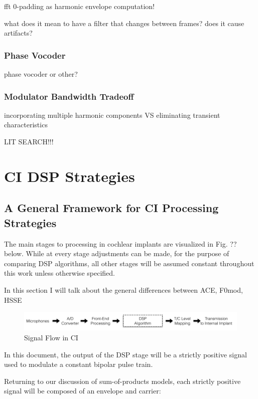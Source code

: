 \documentclass [11pt, proquest] {uwthesis}[2015/03/03]
\begin{document}
fft 0-padding as harmonic envelope computation!

		what does it mean to have a filter that changes
		between frames?  does it cause artifacts?


\subsection{Phase Vocoder}

phase vocoder or other?

\subsection{Modulator Bandwidth Tradeoff}

incorporating multiple harmonic components VS eliminating transient characteristics


LIT SEARCH!!!



\chapter{CI DSP Strategies}


\section{A General Framework for CI Processing Strategies}

The main stages to processing in cochlear implants are visualized in Fig. ?? below.  While at every stage adjustments can be made, for the purpose of comparing DSP algorithms, all other stages will be assumed constant throughout this work unless otherwise specified.

In this section I will talk about the general differences between ACE, F0mod, HSSE

\begin{figure}[!ht]
  \centering
    \includegraphics[width=1.0\textwidth]{CI_Signal_FlowTEMP}   
    \caption{Signal Flow in CI}
\end{figure}

In this document, the output of the DSP stage will be a strictly positive signal used to modulate a constant bipolar pulse train.

Returning to our discussion of sum-of-products models, each strictly positive signal will be composed of an envelope and carrier:
\end{document}
